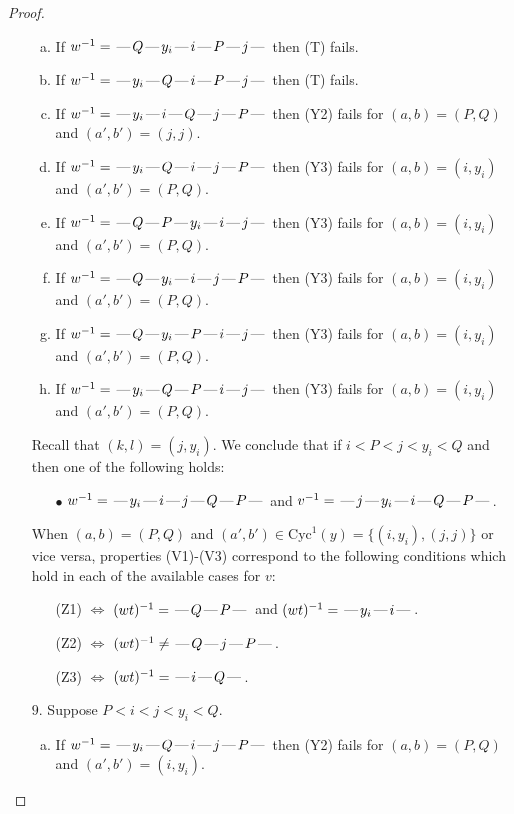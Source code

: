 \documentclass[10pt]{article}
\theoremstyle{definition}
\theoremstyle{definition}
\def\dash{\text{\hspace{0.5mm}---\hspace{0.5mm}}}
\def\Cyc{\mathrm{Cyc}}
\begin{document}
\begin{proof}
\begin{enumerate}
\begin{enumerate}[(a)]
\item If $w^{-1} = \dash Q\dash y_i\dash i\dash P\dash j\dash $ then (T) fails.
\item If $w^{-1} = \dash y_i\dash Q\dash i\dash P\dash j\dash $ then (T) fails.
\item If $w^{-1} = \dash y_i\dash i\dash Q\dash j\dash P\dash $ then (Y2) fails for $(a,b)=(P,Q)$ and $(a',b')=(j,j)$.
\item If $w^{-1} = \dash y_i\dash Q\dash i\dash j\dash P\dash $ then (Y3) fails for $(a,b)=(i,y_i)$ and $(a',b')=(P,Q)$.
\item If $w^{-1} = \dash Q\dash P\dash y_i\dash i\dash j\dash $ then (Y3) fails for $(a,b)=(i,y_i)$ and $(a',b')=(P,Q)$.
\item If $w^{-1} = \dash Q\dash y_i\dash i\dash j\dash P\dash $ then (Y3) fails for $(a,b)=(i,y_i)$ and $(a',b')=(P,Q)$.
\item If $w^{-1} = \dash Q\dash y_i\dash P\dash i\dash j\dash $ then (Y3) fails for $(a,b)=(i,y_i)$ and $(a',b')=(P,Q)$.
\item If $w^{-1} = \dash y_i\dash Q\dash P\dash i\dash j\dash $ then (Y3) fails for $(a,b)=(i,y_i)$ and $(a',b')=(P,Q)$.
\end{enumerate}
Recall that $(k,l) = (j,y_i)$.
We conclude that if $i < P < j < y_i < Q$ and then one of the following holds:
\begin{enumerate}
\item[$\bullet$] $w^{-1} = \dash y_i\dash i\dash j\dash Q\dash P\dash $ and $v^{-1} = \dash j\dash y_i\dash i\dash Q\dash P\dash $.
\end{enumerate}
When $(a,b)= (P,Q)$ and $(a',b')\in \Cyc^1(y)=\{(i,y_i),(j,j)\}$ or vice versa,
properties (V1)-(V3) correspond to the following conditions which hold in
each of the available cases for $v$:
\begin{enumerate}
\item[](Z1) $\Leftrightarrow$ $(wt)^{-1} = \dash Q \dash P \dash$  and $(wt)^{-1} = \dash y_i \dash i \dash$.
\item[](Z2) $\Leftrightarrow$ $(wt)^{-1} \neq \dash Q \dash j \dash P \dash$.
\item[](Z3) $\Leftrightarrow$ $(wt)^{-1} = \dash i \dash Q \dash$.
\end{enumerate}
\item[$9$.] Suppose $P < i < j < y_i < Q$.
\begin{enumerate}[(a)]
\item If $w^{-1} = \dash y_i\dash Q\dash i\dash j\dash P\dash $ then (Y2) fails for $(a,b)=(P,Q)$ and $(a',b')=(i,y_i)$.

\end{enumerate}
\end{enumerate}
\end{proof}
\end{document}
